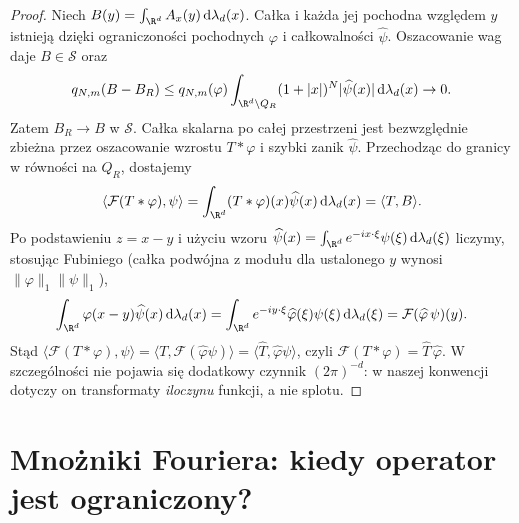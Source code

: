 \begin{proof}
Niech $B(y)=\int_{\R^d}A_x(y)\,\mathrm d\lambda_d(x)$.
Całka i każda jej pochodna względem $y$ istnieją
dzięki ograniczoności pochodnych $\varphi$
i całkowalności $\widehat\psi$. Oszacowanie wag
daje $B\in\mathcal S$ oraz
\[
 q_{N,m}(B-B_R)\le q_{N,m}(\varphi)
 \int_{\R^d\setminus Q_R}(1+|x|)^N
 |\widehat\psi(x)|\,\mathrm d\lambda_d(x)\to0.
\]
Zatem $B_R\to B$ w $\mathcal S$.
Całka skalarna po całej przestrzeni jest
bezwzględnie zbieżna przez oszacowanie
wzrostu $T*\varphi$ i szybki zanik $\widehat\psi$.
Przechodząc do granicy w równości na $Q_R$,
dostajemy
\[
 \langle\mathcal F(T*\varphi),\psi\rangle
 =\int_{\R^d}(T*\varphi)(x)\widehat\psi(x)
 \,\mathrm d\lambda_d(x)
 =\langle T,B\rangle.
\]
Po podstawieniu $z=x-y$ i użyciu wzoru
$\widehat\psi(x)=\int_{\R^d}e^{-ix\cdot\xi}\psi(\xi)
\,\mathrm d\lambda_d(\xi)$ liczymy, stosując Fubiniego
(całka podwójna z modułu dla ustalonego $y$
wynosi $\|\varphi\|_1\|\psi\|_1$),
\[
 \int_{\R^d}\varphi(x-y)\widehat\psi(x)
 \,\mathrm d\lambda_d(x)
 =\int_{\R^d}e^{-iy\cdot\xi}\widehat\varphi(\xi)
 \psi(\xi)\,\mathrm d\lambda_d(\xi)
 =\mathcal F(\widehat\varphi\,\psi)(y).
\]
Stąd $\langle\mathcal F(T*\varphi),\psi\rangle
=\langle T,\mathcal F(\widehat\varphi\psi)\rangle
=\langle\widehat T,\widehat\varphi\psi\rangle$,
czyli $\mathcal F(T*\varphi)=\widehat T\,\widehat\varphi$.
W szczególności nie pojawia się dodatkowy czynnik
$(2\pi)^{-d}$: w naszej konwencji dotyczy on
transformaty \emph{iloczynu} funkcji, a nie splotu.
\end{proof}

\section{Mnożniki Fouriera: kiedy operator jest ograniczony?}
\label{sec:pde8-multipliers}

